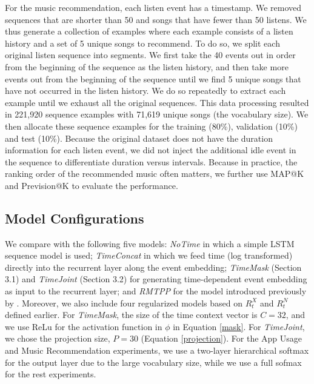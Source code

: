 \documentclass{article} %
\begin{document}
For the music recommendation, each listen event has a timestamp. We removed sequences that are shorter than 50 and songs that have fewer than 50 listens. We thus generate a collection of examples where each example consists of a listen history and a set of 5 unique songs to recommend. To do so, we split each original listen sequence into segments. We first take the 40 events out in order from the beginning of the sequence as the listen history, and then take more events out from the beginning of the sequence until we find 5 unique songs that have not occurred in the listen history. We do so repeatedly to extract each example until we exhaust all the original sequences. This data processing resulted in 221,920 sequence examples with 71,619 unique songs (the vocabulary size). We then allocate these sequence examples for the training (80\%), validation (10\%) and test (10\%). Because the original dataset does not have the duration information for each listen event, we did not inject the additional idle event in the sequence to differentiate duration versus intervals. Because in practice, the ranking order of the recommended music often matters, we further use MAP@K and Prevision@K to evaluate the performance.

\subsection{Model Configurations}
We compare with the following five models: \emph{NoTime} in which a simple LSTM sequence model is used; \emph{TimeConcat} in which we feed time (log transformed) directly into the recurrent layer along the event embedding; \emph{TimeMask} (Section 3.1) and \emph{TimeJoint} (Section 3.2) for generating time-dependent event embedding as input to the recurrent layer; and 
\emph{RMTPP} for the model introduced previously by \citep{DuDaiTri16}. Moreover, we also include four regularized models based on $R_{t}^X$ and $R_{t}^N$ defined earlier. For \emph{TimeMask}, the size of the time context vector is $C=32$, and we use ReLu for the activation function in $\phi$ in Equation \ref{mask}. For \emph{TimeJoint}, we chose the projection size, $P=30$ (Equation \ref{projection}). For the App Usage and Music Recommendation experiments, we use a two-layer hierarchical softmax \citep{Morin05hierarchicalprobabilistic} for the output layer due to the large vocabulary size, while we use a full sofmax for the rest experiments.
\end{document}
